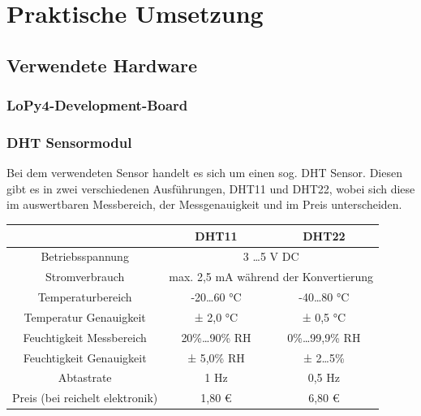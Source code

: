 
\chapter{Praktische Umsetzung} \label{Praktische Umsetzung}
\section{Verwendete Hardware} \label{Hardware}
\subsection{LoPy4-Development-Board} \label{LoPy4}



\subsection{DHT Sensormodul} \label{DHT}

Bei dem verwendeten Sensor handelt es sich um einen sog. DHT Sensor. Diesen gibt es in zwei verschiedenen Ausführungen, DHT11 und DHT22, wobei sich diese im auswertbaren Messbereich, der Messgenauigkeit und im Preis unterscheiden.

\begin{adjustwidth}{-1in}{-1in}%
	\begin{center}
	
	        \begin{tabular}{ccc}
			\toprule
			 & \textbf{DHT11} & \textbf{DHT22}\\

			\midrule
			Betriebsspannung & \multicolumn{2}{c}{3 \dots 5 V DC}\\
			Stromverbrauch & \multicolumn{2}{c}{max. 2,5 mA während der Konvertierung}\\
			Temperaturbereich & -20\dots 60 °C & -40\dots 80 °C  \\
			Temperatur Genauigkeit & ± 2,0 °C & ± 0,5 °C\\
			Feuchtigkeit Messbereich & 20\%\dots90\% RH & 0\%\dots99,9\% RH\\
			Feuchtigkeit Genauigkeit & ± 5,0\% RH & ± 2\dots5\%\\
			Abtastrate & 1 Hz & 0,5 Hz \\

			\midrule
			Preis (bei reichelt elektronik) & 1,80 € & 6,80 €\\

			\bottomrule
	
	        \end{tabular}
		\label{}
		 \label{tab:vergleichDHT} 
	\end{center}
\end{adjustwidth}

